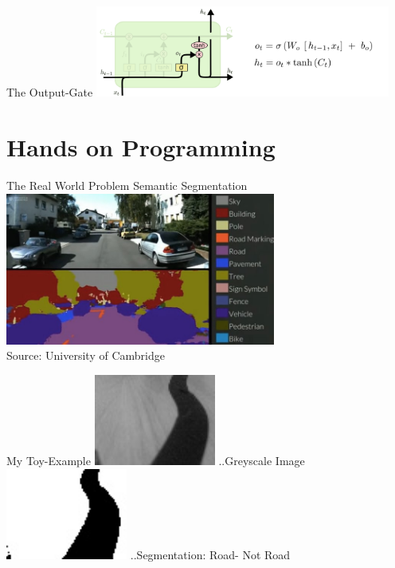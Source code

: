 \begin{frame}{The Output-Gate}
\includegraphics[height=3.0cm]{data/LSTM3-focus-o.png}\\ 
\end{frame}

\section{Hands on Programming}
\begin{frame}
\sectionpage
\end{frame}

\begin{frame}{The Real World Problem}
Semantic Segmentation\\
\includegraphics[height=5.0cm]{data/segnet.jpg}\\ 
Source: University of Cambridge
\end{frame}

\begin{frame}{My Toy-Example}
\includegraphics[height=3.0cm]{data/greyimage.jpg} ..Greyscale Image\\ 
\includegraphics[height=3.0cm]{data/segmentation.jpg} ..Segmentation: Road- Not Road\\ 
\end{frame}

